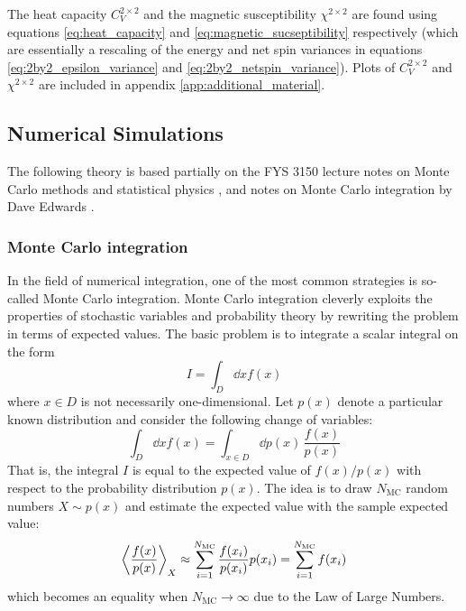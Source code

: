 \documentclass[nofootinbib,reprint,english]{revtex4-1}
\begin{document}
The heat capacity \(C_V^{2\times2}\) and the magnetic susceptibility \(\chi^{2\times2}\) are found using equations \eqref{eq:heat_capacity} and \eqref{eq:magnetic_sucseptibility} respectively (which are essentially a rescaling of the energy and net spin variances in equations \eqref{eq:2by2_epsilon_variance} and \eqref{eq:2by2_netspin_variance}). Plots of \(C_V^{2\times2}\) and \(\chi^{2\times2}\) are included in appendix \ref{app:additional_material}.



\subsection{Numerical Simulations}
The following theory is based partially on the FYS 3150 lecture notes on Monte Carlo methods \cite{montecarlo_lec_notes} and statistical physics \cite{statphys}, and notes on Monte Carlo integration by Dave Edwards \cite{montecarlo_Edwards}.
\subsubsection{Monte Carlo integration}
In the field of numerical integration, one of the most common strategies is so-called Monte Carlo integration. Monte Carlo integration cleverly exploits the properties of stochastic variables and probability theory by rewriting the problem in terms of expected values. The basic problem is to integrate a scalar integral on the form
\begin{equation}\label{eq:general_integral}
I=\int_D\dd{x}f(x)
\end{equation}
where \(x\in D\) is not necessarily one-dimensional. Let \(p(x)\) denote a particular known distribution and consider the following change of variables:
\begin{equation}\label{eq:integral_to_expected_value}
\int_D\dd{x}f(x)=\int_{x\in D}\dd{p(x)}\,\frac{f(x)}{p(x)}
\end{equation}
That is, the integral \(I\) is equal to the expected value of \(f(x)/p(x)\) with respect to the probability distribution \(p(x)\). The idea is to draw \(N_\text{MC}\) random numbers \(X\sim p(x)\) and estimate the expected value with the sample expected value:
\begin{equation}\label{eq:approximated_expected_value}
\expval{\frac{f(x)}{p(x)}}_X\approx\sum_{i=1}^{N_\text{MC}}\frac{f(x_i)}{p(x_i)}p(x_i)=\sum_{i=1}^{N_\text{MC}}f(x_i)
\end{equation}
which becomes an equality when \(N_\text{MC}\to\infty\) due to the Law of Large Numbers.
\end{document}
